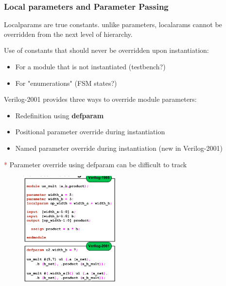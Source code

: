 \documentclass[t, notes, xcolor=table]{beamer}
\begin{document}
\begin{frame}
\frametitle{Local parameters and Parameter Passing}

\scriptsize{
\begin{multicols}{2}
Localparams are true constants. unlike parameters, localarams cannot be overridden from the next level of hierarchy.
\newline

Use of constants that should never be overridden upon instantiation:
\begin{itemize}
\item For a module that is not instantiated (testbench?)
\item For "enumerations" (FSM states?)
\end{itemize}
Verilog-2001 provides three ways to override module parameters:
\begin{itemize}
\item Redefinition using \textbf{defparam}
\item Positional parameter override during instantiation
\item Named parameter override during instantiation (new in Verilog-2001)
\end{itemize}
\textcolor{red}* Parameter override using defparam can be difficult to track

\columnbreak

\begin{figure}
    \includegraphics[width=0.45\textwidth]{img/04_param2.png}
\end{figure}

\end{multicols}
}
\end{frame}
\end{document}
